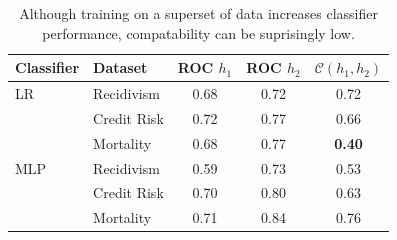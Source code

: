 \documentclass[letterpaper]{article} %
\newcommand{\?}{\mbox{?}}
\newcommand{\hone}{\mbox{$h_1$}}
\newcommand{\htwo}{\mbox{$h_2$}}
\newcommand{\compatscore}{\mathcal{C}}
\begin{document}
\begin{table}[t]
\footnotesize
\centering
\begin{tabular}{|l|l|c|c|c|}
\hline
Classifier & Dataset                         & ROC $\hone$ & ROC $\htwo$ & $\compatscore(\hone, \htwo)$ \\
\hline
LR & Recidivism       &   0.68 &        0.72     &   0.72               \\
& Credit Risk          &   0.72     &    0.77    &   0.66              \\
& Mortality    &    0.68 &    0.77    &    {\bf 0.40}                    \\
\hline
MLP & Recidivism   &   0.59     &     0.73   &     0.53                    \\
& Credit Risk     &  0.70   &    0.80    &     0.63                     \\
& Mortality &       0.71 &     0.84   &     0.76            \\
\hline
\end{tabular}
\caption{\label{tab:score} Although training on a superset of data increases classifier performance, compatability can be suprisingly low.}
\end{table}
\end{document}
